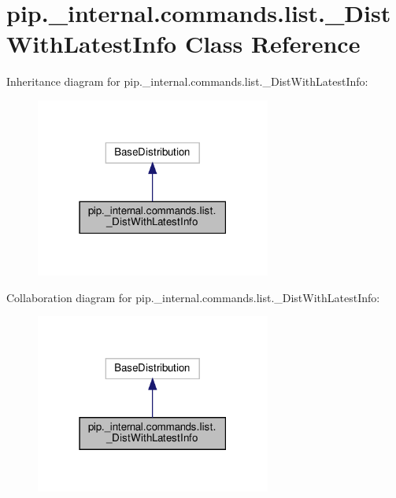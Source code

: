 \hypertarget{classpip_1_1__internal_1_1commands_1_1list_1_1__DistWithLatestInfo}{}\section{pip.\+\_\+internal.\+commands.\+list.\+\_\+\+Dist\+With\+Latest\+Info Class Reference}
\label{classpip_1_1__internal_1_1commands_1_1list_1_1__DistWithLatestInfo}


Inheritance diagram for pip.\+\_\+internal.\+commands.\+list.\+\_\+\+Dist\+With\+Latest\+Info\+:
\nopagebreak
\begin{figure}[H]
\begin{center}
\leavevmode
\includegraphics[width=219pt]{classpip_1_1__internal_1_1commands_1_1list_1_1__DistWithLatestInfo__inherit__graph}
\end{center}
\end{figure}


Collaboration diagram for pip.\+\_\+internal.\+commands.\+list.\+\_\+\+Dist\+With\+Latest\+Info\+:
\nopagebreak
\begin{figure}[H]
\begin{center}
\leavevmode
\includegraphics[width=219pt]{classpip_1_1__internal_1_1commands_1_1list_1_1__DistWithLatestInfo__coll__graph}
\end{center}
\end{figure}


